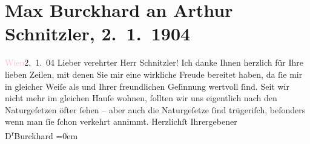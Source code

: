 

               \section[Max Burckhard an Arthur Schnitzler, 2. 1. 1904]{ Max Burckhard an Arthur Schnitzler, 2. 1. 1904}\nopagebreak{}\rehead{ }\normalsize\beginnumbering{} \toendnotes[C]{\smallbreak\pagebreak[2]} 
\toendnotes[C]{\smallbreak}\pstart
           \raggedleft{}{\pb}\textcolor{pink}{Wien}{}\ledrightnote{\textcolor{pink}{Wien}}{ }2. 1. 04\pend
           \pstart{}Lieber verehrter Herr Schnitzler!\pend\pstart
           Ich danke Ihnen herzlich für Ihre lieben Zeilen, mit denen Sie mir eine wirkliche
                    Freude bereitet haben, da ſie mir in gleicher Weiſe als \label{K_L01355_1v}\label{K_L01355_1h} und Ihrer
                    freundlichen Geſinnung wertvoll ſind. Seit wir nicht mehr im gleichen Hauſe
                    wohnen, ſollten wir uns eigentlich nach den Naturgeſetzen öfter ſehen – aber {\pb}auch die Naturgeſetze ſind
                    trügeriſch, beſonders wenn man ſie ſchon verkehrt annimmt.\pend
           \pstart
           Herzlichſt Ihr\hspace*{1.5em}ergebener{\\[\baselineskip]}\spacefill\mbox{D\textsuperscript{r}Burckhard}\pend
           \leftskip=0em{}\endnumbering{}  
      